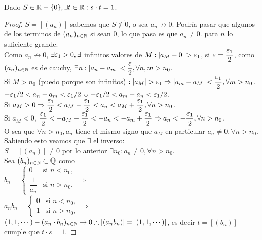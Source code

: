 \begin{theorem}
  Dado $S \in \mathbb{R} - \{0\}, \exists t \in \mathbb{R} : s \cdot t = 1$.
  \begin{proof}
    $S = [(a_n)]$ sabemos que $S \notin \tilde{0}$, o sea $a_n \not \to 0$. Podría pasar que algunos de los terminos de $(a_n)_{n \in \mathbb{N}}$ si sean $0$, lo que pasa es que $a_n \neq 0.$ para $n$ lo suficiente grande. \\
    Como $a_n \not \to 0$, $\exists \varepsilon_1 > 0, \exists$ infinitos valores de $M: |a_M - 0| > \varepsilon_1$, si $\varepsilon = \dfrac{\varepsilon_1}{2}$, como $(a_n)_{n \in \mathbb{N}}$ es de cauchy, $\exists n : |a_n - a_m| < \dfrac{\varepsilon}{2}, \forall n, m > n_0$. \\
    Si $M > n_0$ (puedo porque son infinitos) $: |a_M| > \varepsilon_1 \Rightarrow |a_m - a_M| < \dfrac{\varepsilon_1}{2}, \forall m > n_0$. \\
    $-\varepsilon_1/2 < a_n - a_m < \varepsilon_1 / 2$ o $-\varepsilon_1 / 2 < a_m - a_n < \varepsilon_1 / 2$. \\ 
    Si $a_M > 0 \Rightarrow \dfrac{\varepsilon_1}{2} < a_M - \dfrac{\varepsilon_1}{2} < a_n < a_M + \dfrac{\varepsilon_1}{2}, \forall n > n_0$. \\
    Si $a_M < 0$, $\dfrac{\varepsilon_1}{2} < -a_M - \dfrac{\varepsilon_1}{2} < -a_n<-a_m+ \dfrac{\varepsilon_1}{2} \Rightarrow a_n < -\dfrac{\varepsilon_1}{2}, \forall n > n_0$. \\
    O sea que $\forall n > n_0, a_n$ tiene el mismo signo que $a_M$ en particular $a_n \neq 0, \forall n > n_0$. \\
    Sabiendo esto veamos que $\exists$ el inverso: \\
    $S = [(a_n)] \neq 0$ por lo anterior $\exists n_0 : a_n \neq 0, \forall n > n_0$. \\
    Sea $(b_n)_{n \in \mathbb{N}} \subset \mathbb{Q}$ como \\
    $b_n = \begin{cases}
      0 & \text{si } n < n_0, \\ 
      \dfrac{1}{a_n} & \text{si } n > n_0.
    \end{cases} \Rightarrow$ \\

    $a_n b_n = \begin{cases}
      0 & \text{si } n < n_0, \\
      1 & \text{si } n > n_0,
    \end{cases} \Rightarrow$ \\

    $(1, 1, \cdots) - (a_n \cdot b_n)_{n \in \mathbb{N}} \to 0 \therefore [(a_n b_n)] = [(1, 1, \cdots)]$, es decir $t = [(b_n)]$ cumple que $t \cdot s = 1$.
  \end{proof}
\end{theorem}

